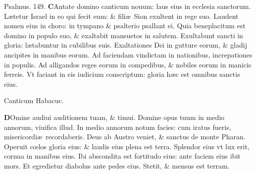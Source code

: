 \documentclass[a5paper,10pt]{book}
\def\ae{æ}
\def\oe{œ}
\begin{document}
\begin{multicols*}{2}
\newline \color{red} Psalmus. 149. \color{black}
\lettrine[lines=2]{\bfseries \color{red} C}{}Antate domino canticum nouum: laus eius in ecclesia sanctorum.
\newline \color{red} L\color{black}\ae tetur Israel in eo qui fecit eum: \& fili\ae \ Sion exultent in rege suo. %
\newline \color{red} L\color{black}audent nomen eius in choro: in tympano \& psalterio psallant ei.
\newline \color{red} Q\color{black}uia beneplacitum est domino in populo suo, \& exaltabit mansuetos in salutem.
\newline \color{red} E\color{black}xultabunt sancti in gloria: l\ae tabuntur in cubilibus suis.
\newline \color{red} E\color{black}xaltationes Dei in gutture eorum, \& gladij ancipites in manibus eorum.
\newline \color{red} A\color{black}d faciendam vindictam in nationibus, increpationes in populis.
\newline \color{red} A\color{black}d alligandos reges eorum in compedibus, \& nobiles eorum in manicis ferreis.
\newline \color{red} V\color{black}t faciant in eis iudicium conscriptum: gloria h\ae c est omnibus sanctis eius.
\vspace{-1em}
\begin{center} \color{red}
Canticum Habacuc.
\end{center}
\vspace{-1em}
\lettrine[lines=2]{\bfseries \color{red} D}{}Omine audiui auditionem tuam, \& timui.
\newline \color{red} D\color{black}omine opus tuum in medio annorum, viuifica illud.
\newline \color{red} I\color{black}n medio annorum notum facies: cum iratus fueris, misericordi\ae \ recordaberis.
\newline \color{red} D\color{black}eus ab Austro veniet, \& sanctus de monte Pharan.
\newline \color{red} O\color{black}peruit c\oe los gloria eius: \& laudis eius plena est terra.
\newline \color{red} S\color{black}plendor eius vt lux erit, cornua in manibus eius.
\newline \color{red} I\color{black}bi abscondita est fortitudo eius: ante faciem eius ibit mors.
\newline \color{red} E\color{black}t egredietur diabolus ante pedes eius. Stetit, \& mensus est terram.

\end{multicols*}
\end{document}
